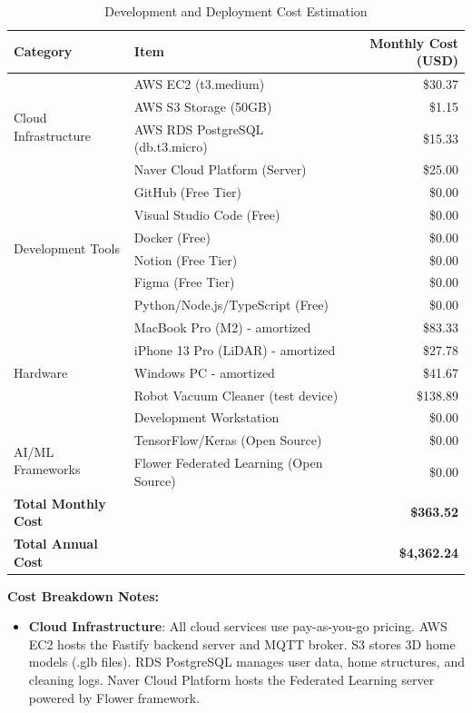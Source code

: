 \documentclass[conference]{IEEEtran}
\begin{document}
\begin{enumerate}
\begin{table}[H]
\centering
\caption{Development and Deployment Cost Estimation}
\begin{tabular}{|l|l|r|}
\hline
\textbf{Category} & \textbf{Item} & \textbf{Monthly Cost (USD)} \\
\hline
\multirow{4}{*}{Cloud Infrastructure} & AWS EC2 (t3.medium) & \$30.37 \\
& AWS S3 Storage (50GB) & \$1.15 \\
& AWS RDS PostgreSQL (db.t3.micro) & \$15.33 \\
& Naver Cloud Platform (Server) & \$25.00 \\
\hline
\multirow{6}{*}{Development Tools} & GitHub (Free Tier) & \$0.00 \\
& Visual Studio Code (Free) & \$0.00 \\
& Docker (Free) & \$0.00 \\
& Notion (Free Tier) & \$0.00 \\
& Figma (Free Tier) & \$0.00 \\
& Python/Node.js/TypeScript (Free) & \$0.00 \\
\hline
\multirow{5}{*}{Hardware} & MacBook Pro (M2) - amortized & \$83.33 \\
& iPhone 13 Pro (LiDAR) - amortized & \$27.78 \\
& Windows PC - amortized & \$41.67 \\
& Robot Vacuum Cleaner (test device) & \$138.89 \\
& Development Workstation & \$0.00 \\
\hline
\multirow{2}{*}{AI/ML Frameworks} & TensorFlow/Keras (Open Source) & \$0.00 \\
& Flower Federated Learning (Open Source) & \$0.00 \\
\hline
\textbf{Total Monthly Cost} & & \textbf{\$363.52} \\
\textbf{Total Annual Cost} & & \textbf{\$4,362.24} \\
\hline
\end{tabular}
\end{table}

\textbf{Cost Breakdown Notes:}
\begin{itemize}
    \item \textbf{Cloud Infrastructure}: All cloud services use pay-as-you-go pricing. AWS EC2 hosts the Fastify backend server and MQTT broker. S3 stores 3D home models (.glb files). RDS PostgreSQL manages user data, home structures, and cleaning logs. Naver Cloud Platform hosts the Federated Learning server powered by Flower framework.


\end{itemize}
\end{enumerate}
\end{document}
